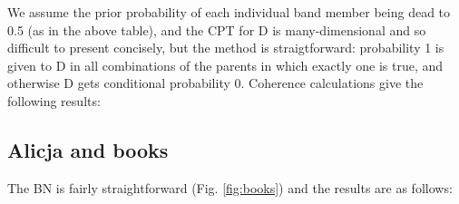 \documentclass[10pt,]{scrartcl}
\begin{document}
We assume the prior probability of each individual band member being
dead to 0.5 (as in the above table), and the CPT for \textsf{D} is
many-dimensional and so difficult to present concisely, but the method
is straigtforward: probability 1 is given to \textsf{D} in all
combinations of the parents in which exactly one is true, and otherwise
\textsf{D} gets conditional probability 0. Coherence calculations give
the following results:

\begin{table}[H]
\centering
{}
\end{table}

\begin{table}[H]
\centering
{}
\end{table}

\subsection{Alicja and books}\label{alicja-and-books-1}

The BN is fairly straightforward (Fig. \ref{fig:books}) and the results
are as follows:
\end{document}
